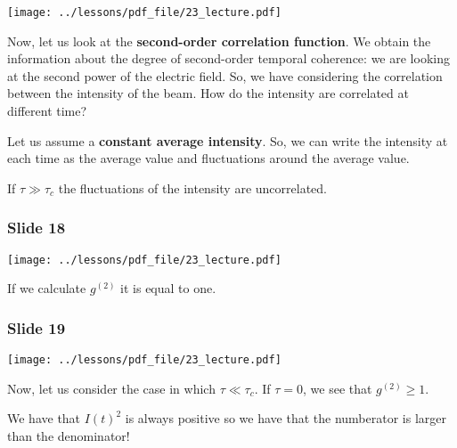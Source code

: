 \documentclass[../main/main.tex]{subfiles}
\begin{document}
\begin{minipage}[]{0.5\linewidth}
\centering
\texttt{[image: ../lessons/pdf\_file/23\_lecture.pdf]}
\end{minipage}
\hspace{0.3cm}\vspace{0.3cm}
\begin{minipage}[c]{0.47\linewidth}

Now, let us look at the \textbf{second-order correlation function}. We obtain the information about the degree of second-order temporal coherence: we are looking at the second power of the electric field. So, we have considering the correlation between the intensity of the beam. How do the intensity are correlated at different time?

Let us assume a \textbf{constant average intensity}. So, we can write the intensity at each time as the average value and fluctuations around the average value.

If \( \tau \gg \tau _c \) the fluctuations of the intensity are uncorrelated.

\end{minipage}

\subsubsection*{Slide 18}

\begin{minipage}[]{0.5\linewidth}
\centering
\texttt{[image: ../lessons/pdf\_file/23\_lecture.pdf]}
\end{minipage}
\hspace{0.3cm}\vspace{0.3cm}
\begin{minipage}[c]{0.47\linewidth}

If we calculate \( g^{(2)} \) it is equal to one.

\end{minipage}

\subsubsection*{Slide 19}

\begin{minipage}[]{0.5\linewidth}
\centering
\texttt{[image: ../lessons/pdf\_file/23\_lecture.pdf]}
\end{minipage}
\hspace{0.3cm}\vspace{0.3cm}
\begin{minipage}[c]{0.47\linewidth}

Now, let us consider the case in which \( \tau \ll \tau _c \). If \( \tau = 0 \), we see that \( g^{(2)} \ge 1 \).

We have that \( I(t)^2 \) is always positive so we have that the numberator is larger than the denominator!

\end{minipage}
\end{document}
